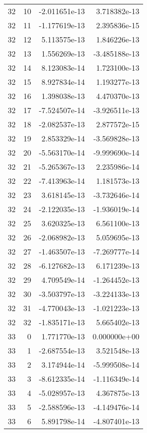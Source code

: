 \begin{tabular}{rrrr}
  32 &   10 & -2.011651e-13 &  3.718382e-13 \\
  32 &   11 & -1.177619e-13 &  2.395836e-15 \\
  32 &   12 &  5.113575e-13 &  1.846226e-13 \\
  32 &   13 &  1.556269e-13 & -3.485188e-13 \\
  32 &   14 &  8.123083e-14 &  1.723100e-13 \\
  32 &   15 &  8.927834e-14 &  1.193277e-13 \\
  32 &   16 &  1.398038e-13 &  4.470370e-13 \\
  32 &   17 & -7.524507e-14 & -3.926511e-13 \\
  32 &   18 & -2.082537e-13 &  2.877572e-15 \\
  32 &   19 &  2.853329e-14 & -3.569828e-13 \\
  32 &   20 & -5.563170e-14 & -9.999690e-14 \\
  32 &   21 & -5.265367e-13 &  2.235986e-14 \\
  32 &   22 & -7.413963e-14 &  1.181573e-13 \\
  32 &   23 &  3.618145e-13 & -3.732646e-14 \\
  32 &   24 & -2.122035e-13 & -1.936019e-14 \\
  32 &   25 &  3.620325e-13 &  6.561100e-13 \\
  32 &   26 & -2.068982e-13 &  5.059695e-13 \\
  32 &   27 & -1.463507e-13 & -7.269777e-14 \\
  32 &   28 & -6.127682e-13 &  6.171239e-13 \\
  32 &   29 &  4.709549e-14 & -1.264452e-13 \\
  32 &   30 & -3.503797e-13 & -3.224133e-13 \\
  32 &   31 & -4.770043e-13 & -1.021223e-13 \\
  32 &   32 & -1.835171e-13 &  5.665402e-13 \\
  33 &    0 &  1.771770e-13 &  0.000000e+00 \\
  33 &    1 & -2.687554e-13 &  3.521548e-13 \\
  33 &    2 &  3.174944e-14 & -5.999508e-14 \\
  33 &    3 & -8.612335e-14 & -1.116349e-14 \\
  33 &    4 & -5.028957e-13 &  4.367875e-13 \\
  33 &    5 & -2.588596e-13 & -4.149476e-14 \\
  33 &    6 &  5.891798e-14 & -4.807401e-13 \\

\end{tabular}
